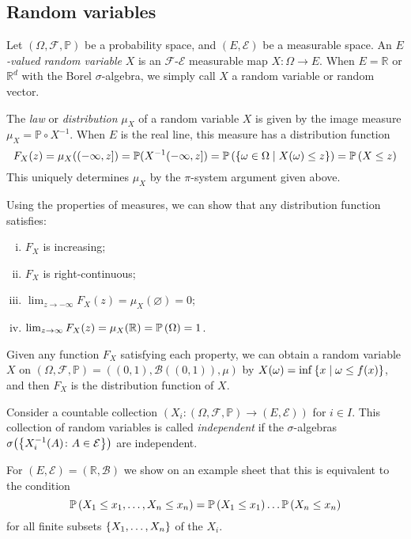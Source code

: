 \subsection{Random variables}
\begin{definition}
	Let \( (\Omega, \mathcal F, \mathbb P) \) be a probability space, and \( (E, \mathcal E) \) be a measurable space.
	An \emph{\( E \)-valued random variable} \( X \) is an \( \mathcal F \)-\( \mathcal E \) measurable map \( X \colon \Omega \to E \).
	When \( E = \mathbb R \) or \( \mathbb R^d \) with the Borel \( \sigma \)-algebra, we simply call \( X \) a random variable or random vector.

	The \emph{law} or \emph{distribution} \( \mu_X \) of a random variable \( X \) is given by the image measure \( \mu_X = \mathbb P \circ X^{-1} \).
	When \( E \) is the real line, this measure has a distribution function
	\[ F_X(z) = \mu_X((-\infty, z]) = \mathbb P(X^{-1}(-\infty,z]) = \mathbb{P}\left({\qty{\omega \in \Omega \mid X(\omega) \leq z}}\right) = \mathbb{P}\left({X \leq z}\right) \]
	This uniquely determines \( \mu_X \) by the \( \pi \)-system argument given above.
\end{definition}
Using the properties of measures, we can show that any distribution function satisfies:
\begin{enumerate}[(i)]
	\item \( F_X \) is increasing;
	\item \( F_X \) is right-continuous;
	\item \( \lim_{z \to -\infty} F_X(z) = \mu_X(\varnothing) = 0 \);
	\item \( \lim_{z \to \infty} F_X(z) = \mu_X(\mathbb R) = \mathbb{P}\left({\Omega}\right) = 1 \).
\end{enumerate}
Given any function \( F_X \) satisfying each property, we can obtain a random variable \( X \) on \( (\Omega, \mathcal F, \mathbb P) = ((0,1), \mathcal B((0,1)), \mu) \) by \( X(\omega) = \inf\qty{x \mid \omega \leq f(x)} \), and then \( F_X \) is the distribution function of \( X \).
\begin{definition}
	Consider a countable collection \( (X_i \colon (\Omega, \mathcal F, \mathbb P) \to (E, \mathcal E)) \) for \( i \in I \).
	This collection of random variables is called \emph{independent} if the \( \sigma \)-algebras \( \sigma\qty(\qty{X_i^{-1}(A) \colon A \in \mathcal E}) \) are independent.
\end{definition}
For \( (E, \mathcal E) = (\mathbb R, \mathcal B) \) we show on an example sheet that this is equivalent to the condition
\[ \mathbb{P}\left({X_1 \leq x_1, \dots, X_n \leq x_n}\right) = \mathbb{P}\left({X_1 \leq x_1}\right) \dots \mathbb{P}\left({X_n \leq x_n}\right) \]
for all finite subsets \( \qty{X_1, \dots, X_n} \) of the \( X_i \).

